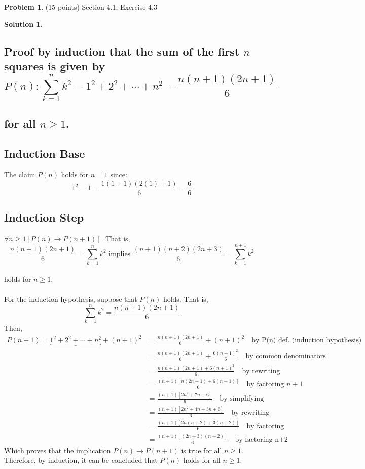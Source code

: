 \documentclass{article}
\theoremstyle{definition}
\newtheorem{problem}{Problem}
\newtheorem*{solution}{Solution}
\begin{document}
\newpage
\begin{problem} (15 points) Section 4.1, Exercise 4.3 
\end{problem}
\begin{solution}
\hspace{1cm}
\subsection*{Proof by induction that the sum of the first $n$ squares is given by\\
$$ P(n): \sum_{k=1}^{n} k^2 = 1^2 + 2^2 + \cdots + n^2 = \frac{n(n+1)(2n+1)}{6}$$
\\ for all $n \geqslant 1$.}
\subsection*{Induction Base}
The claim $P(n)$ holds for $n = 1$ since:\\ $$1^2 = 1 = \frac{1(1+1)(2(1) + 1)}{6} = \frac{6}{6}$$
\subsection*{Induction Step}
$\forall n \geqslant 1 [P(n) \rightarrow P(n+1)]$. That is,\\
$$\frac{n(n+1)(2n+1)}{6} = \sum_{k=1}^{n} k^2 \mbox{ implies } \frac{(n+1)(n+2)(2n+3)}{6} = \sum_{k=1}^{n+1} k^2$$\\ holds for $n \geqslant 1$.\\\\
For the induction hypothesis, suppose that $P(n)$ holds. That is,\\ $$\sum_{k=1}^{n} k^2 = \frac{n(n+1)(2n+1)}{6}$$Then,
\begin{align*}
P(n+1) = \underbrace{1^2 + 2^2 + \cdots + n^2} + (n+1)^2 &= \frac{n(n+1)(2n+1)}{6} + (n+1)^2\quad \mbox{by P(n) def. (induction hypothesis)}\\
&=\frac{n(n+1)(2n+1)}{6} + \frac{6(n+1)^2}{6} \quad \mbox{by common denominators}\\
&= \frac{n(n+1)(2n+1) + 6(n+1)^2}{6} \quad \mbox{by rewriting}\\
&= \frac{(n+1)[n(2n+1) + 6(n+1)]}{6} \quad \mbox{by factoring $n+1$}\\
&= \frac{(n+1)[2n^2 + 7n + 6]}{6} \quad \mbox {by simplifying}\\
&= \frac{(n+1)[2n^2 + 4n + 3n + 6]}{6} \quad \mbox{by rewriting}\\
&= \frac{(n+1)[2n(n+2)+3(n+2)]}{6} \quad \mbox{by factoring}\\
&= \frac{(n+1)[(2n+3)(n+2)]}{6} \quad \mbox{by factoring n+2}
\end{align*}
Which proves that the implication $P(n) \rightarrow P(n+1)$ is true for all $n \geqslant 1$. Therefore, by induction, it can be concluded that $P(n)$ holds for all $n \geqslant 1$.
\end{solution}
\end{document}

